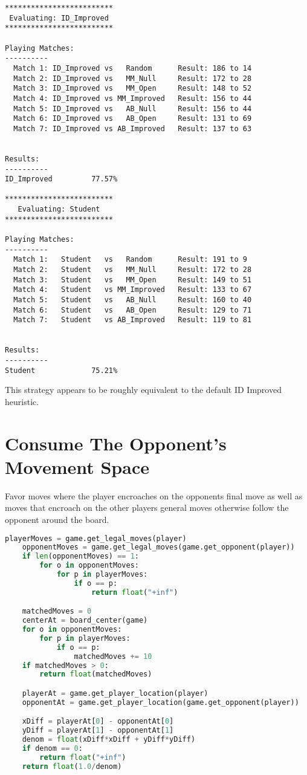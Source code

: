 \documentclass[10pt, a4paper]{article}
\begin{document}
\begin{verbatim}
*************************
 Evaluating: ID_Improved 
*************************

Playing Matches:
----------
  Match 1: ID_Improved vs   Random    	Result: 186 to 14
  Match 2: ID_Improved vs   MM_Null   	Result: 172 to 28
  Match 3: ID_Improved vs   MM_Open   	Result: 148 to 52
  Match 4: ID_Improved vs MM_Improved 	Result: 156 to 44
  Match 5: ID_Improved vs   AB_Null   	Result: 156 to 44
  Match 6: ID_Improved vs   AB_Open   	Result: 131 to 69
  Match 7: ID_Improved vs AB_Improved 	Result: 137 to 63


Results:
----------
ID_Improved         77.57%

*************************
   Evaluating: Student   
*************************

Playing Matches:
----------
  Match 1:   Student   vs   Random    	Result: 191 to 9
  Match 2:   Student   vs   MM_Null   	Result: 172 to 28
  Match 3:   Student   vs   MM_Open   	Result: 149 to 51
  Match 4:   Student   vs MM_Improved 	Result: 133 to 67
  Match 5:   Student   vs   AB_Null   	Result: 160 to 40
  Match 6:   Student   vs   AB_Open   	Result: 129 to 71
  Match 7:   Student   vs AB_Improved 	Result: 119 to 81


Results:
----------
Student             75.21%
\end{verbatim}

This strategy appears to be roughly equivalent to the default ID Improved heuristic.

\section{Consume The Opponent's Movement Space}

Favor moves where the player encroaches on the opponents final move as well as 
moves that encroach on the other players general moves
otherwise follow the opponent around the board.

\begin{lstlisting}[language=Python]
    playerMoves = game.get_legal_moves(player)
    opponentMoves = game.get_legal_moves(game.get_opponent(player))
    if len(opponentMoves) == 1:
        for o in opponentMoves:
            for p in playerMoves:
                if o == p:
                    return float("+inf")

    matchedMoves = 0
    centerAt = board_center(game)
    for o in opponentMoves:
        for p in playerMoves:
            if o == p:
                matchedMoves += 10
    if matchedMoves > 0:
        return float(matchedMoves)

    playerAt = game.get_player_location(player)
    opponentAt = game.get_player_location(game.get_opponent(player))

    xDiff = playerAt[0] - opponentAt[0]
    yDiff = playerAt[1] - opponentAt[1]
    denom = float(xDiff*xDiff + yDiff*yDiff)
    if denom == 0:
        return float("+inf")
    return float(1.0/denom)
\end{lstlisting}
\end{document}

